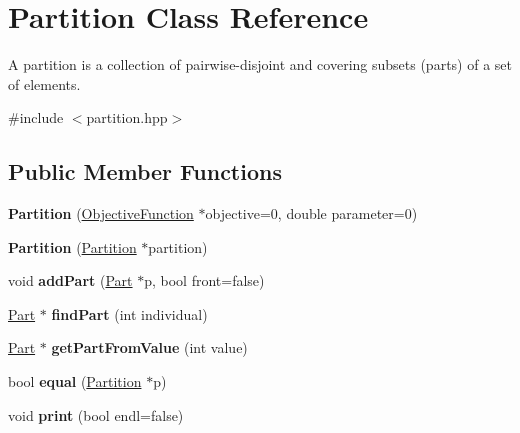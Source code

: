 \hypertarget{classPartition}{\section{Partition Class Reference}
\label{classPartition}
}


A partition is a collection of pairwise-\/disjoint and covering subsets (parts) of a set of elements.  




{\ttfamily \#include $<$partition.\-hpp$>$}

\subsection*{Public Member Functions}
\begin{DoxyCompactItemize}
\item 
\hypertarget{classPartition_ab2274b9cf773fea65da75facdf88ae98}{{\bfseries Partition} (\hyperlink{classObjectiveFunction}{Objective\-Function} $\ast$objective=0, double parameter=0)}\label{classPartition_ab2274b9cf773fea65da75facdf88ae98}

\item 
\hypertarget{classPartition_acb291b3b0ccf48005e141be32fdd7efd}{{\bfseries Partition} (\hyperlink{classPartition}{Partition} $\ast$partition)}\label{classPartition_acb291b3b0ccf48005e141be32fdd7efd}

\item 
\hypertarget{classPartition_a63f82a3a75dc0c3d0d27766b2459c9fe}{void {\bfseries add\-Part} (\hyperlink{classPart}{Part} $\ast$p, bool front=false)}\label{classPartition_a63f82a3a75dc0c3d0d27766b2459c9fe}

\item 
\hypertarget{classPartition_ae21fdef95c1f37a6a677ac145f29b119}{\hyperlink{classPart}{Part} $\ast$ {\bfseries find\-Part} (int individual)}\label{classPartition_ae21fdef95c1f37a6a677ac145f29b119}

\item 
\hypertarget{classPartition_a76ac69e01cafef5af0fef2e917e6fdf1}{\hyperlink{classPart}{Part} $\ast$ {\bfseries get\-Part\-From\-Value} (int value)}\label{classPartition_a76ac69e01cafef5af0fef2e917e6fdf1}

\item 
\hypertarget{classPartition_abced08b339e293866a614b2f21414375}{bool {\bfseries equal} (\hyperlink{classPartition}{Partition} $\ast$p)}\label{classPartition_abced08b339e293866a614b2f21414375}

\item 
\hypertarget{classPartition_a3463b34ab90d020ed40635c473301a64}{void {\bfseries print} (bool endl=false)}\label{classPartition_a3463b34ab90d020ed40635c473301a64}

\end{DoxyCompactItemize}
